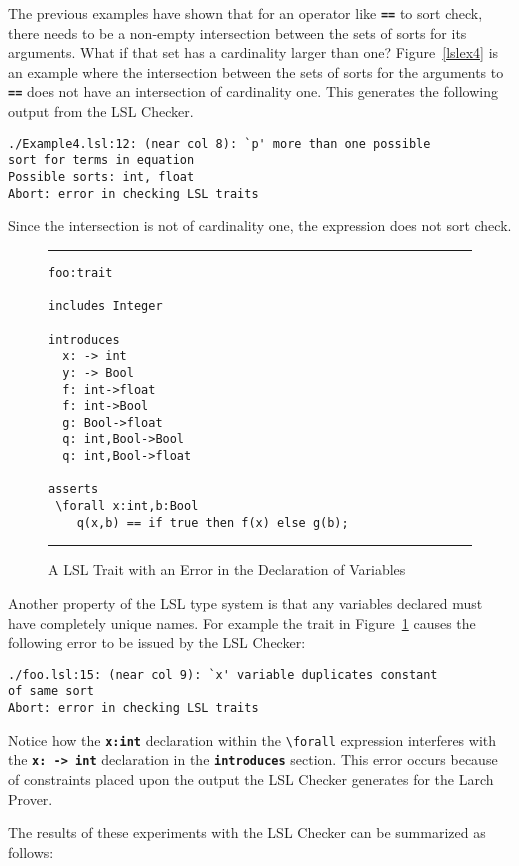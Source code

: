\documentclass[12pt]{article} %
\newcommand{\reserved}[1]{\textbf{\texttt{#1}}} %
\newcommand{\UNSPACEFORBOX}{\vspace{-2ex}}
\newcommand{\HLINE}{\UNSPACEFORBOX%
\begin{flushleft}\rule{\textwidth}{0.01in}\end{flushleft}%
\UNSPACEFORBOX}
\newenvironment{BFIGURE}{

\begin{figure}
\small
\HLINE
}{
\HLINE
\normalsize
\end{figure}
}
\begin{document}
The previous examples have shown that for an operator like
\reserved{==} to sort check, there needs to be a non-empty intersection between
the sets of sorts for its arguments. What if that set has a
cardinality larger than one? Figure~\ref{lslex4} is an example where
the intersection between the sets of sorts for the arguments to
\reserved{==} does not have an intersection of cardinality one. This
generates the following output from the LSL Checker.

\begin{verbatim}
./Example4.lsl:12: (near col 8): `p' more than one possible 
sort for terms in equation 
Possible sorts: int, float 
Abort: error in checking LSL traits
\end{verbatim}

\noindent Since the intersection is not of cardinality one, the
expression does not sort check.

\begin{BFIGURE}
\begin{verbatim}
foo:trait

includes Integer

introduces
  x: -> int
  y: -> Bool
  f: int->float
  f: int->Bool
  g: Bool->float
  q: int,Bool->Bool
  q: int,Bool->float

asserts
 \forall x:int,b:Bool
    q(x,b) == if true then f(x) else g(b);
\end{verbatim}
\caption{A LSL Trait with an Error in the Declaration of Variables}
\label{quanttrait}
\end{BFIGURE}

Another property of the LSL type system is that any variables declared
must have completely unique names. For example the trait in
Figure~\ref{quanttrait} causes the following error to be issued by the
LSL Checker:

\begin{verbatim}
./foo.lsl:15: (near col 9): `x' variable duplicates constant 
of same sort
Abort: error in checking LSL traits
\end{verbatim}

\noindent Notice how the \reserved{x:int} declaration within the
\verb+\+\texttt{forall} expression interferes with the \reserved{x: -> int}
declaration in the \reserved{introduces} section. This error occurs
because of constraints placed upon the output the LSL Checker
generates for the Larch Prover. 

The results of these experiments with the LSL Checker can be
summarized as follows:
\end{document}
